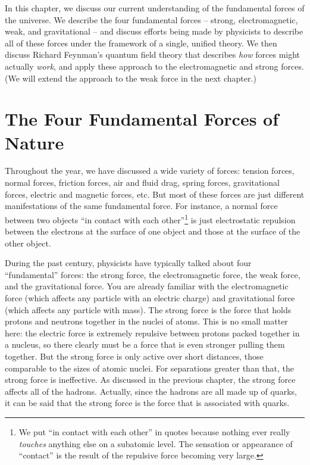 In this chapter, we discuss our current understanding of the
fundamental forces of the universe.  We describe the four
fundamental forces -- strong, electromagnetic, weak, and
gravitational -- and discuss efforts being made by physicists to
describe all of these forces under the framework of a single,
unified theory.  We then discuss Richard Feynman's quantum field
theory that describes {\it how} forces might actually {\it work},
and apply these approach to the electromagnetic and strong forces.
(We will extend the approach to the weak force in the next
chapter.)



\section{The Four Fundamental Forces of Nature}
\label{sec:four_fundamental_forces}

Throughout the year, we have discussed a wide variety of forces:
tension forces, normal forces, friction forces, air and fluid
drag, spring forces, gravitational forces, electric and magnetic
forces, etc.  But most of these forces are just different
manifestations of the same fundamental force.  For instance, a
normal force between two objects ``in contact with each
other''\footnote{We put ``in contact with each other'' in quotes
because nothing ever really {\it touches} anything else on a
subatomic level.  The sensation or appearance of ``contact'' is
the result of the repulsive force becoming very large.} is just
electrostatic repulsion between the electrons at the surface of
one object and those at the surface of the other object.

During the past century, physicists have typically talked about
four ``fundamental'' forces:  the strong force, the
electromagnetic force, the weak force, and the gravitational
force.  You are already familiar with the electromagnetic force
(which affects any particle with an electric charge) and
gravitational force (which affects any particle with mass). The
strong force is the force that holds protons and neutrons together
in the nuclei of atoms. This is no small matter here: the
electric force is extremely repulsive between protons packed
together in a nucleus, so there clearly must be a force that is
even stronger pulling them together.  But the strong force is only
active over short distances, those comparable to the sizes of
atomic nuclei. For separations greater than that, the strong
force is ineffective.  As discussed in the previous chapter, the
strong force affects all of the hadrons.  Actually, since the
hadrons are all made up of quarks, it can be said that the strong
force is the force that is associated with quarks.

